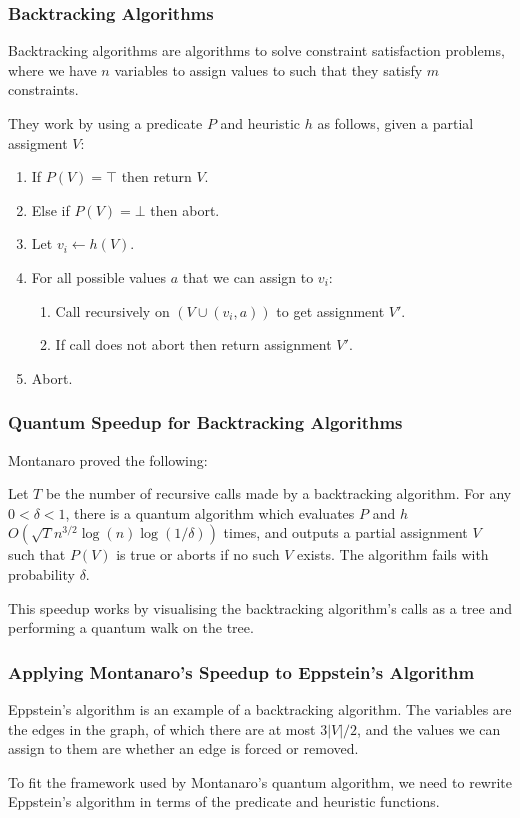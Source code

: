 \documentclass[]{beamer}
\begin{document}
\begin{frame}
\frametitle{Backtracking Algorithms}
Backtracking algorithms are algorithms to solve constraint satisfaction problems, where we have $n$ variables to assign values to such that they satisfy $m$ constraints.

They work by using a predicate $P$ and heuristic $h$ as follows, given a partial assigment $V$:

\begin{enumerate}
\item If $P(V) = \top$ then return $V$.
\item Else if $P(V) = \bot$ then abort.
\item Let $v_{i} \leftarrow h(V)$.
\item For all possible values $a$ that we can assign to $v_{i}$:
\begin{enumerate}
\item Call recursively on $(V \cup (v_{i}, a))$ to get assignment $V'$.
\item If call does not abort then return assignment $V'$.
\end{enumerate}
\item Abort.
\end{enumerate}
\end{frame}

\begin{frame}
\frametitle{Quantum Speedup for Backtracking Algorithms}

Montanaro proved the following:

\begin{theorem}[Montanaro]
Let $T$ be the number of recursive calls made by a backtracking algorithm. For any $0 < \delta < 1$, there is a quantum algorithm which evaluates $P$ and $h$ $O(\sqrt{T}n^{3/2}\log(n)\log(1/\delta))$ times, and outputs a partial assignment $V$ such that $P(V)$ is true or aborts if no such $V$ exists. The algorithm fails with probability $\delta$.
\end{theorem}

This speedup works by visualising the backtracking algorithm's calls as a tree and performing a quantum walk on the tree.
\end{frame}

\begin{frame}
\frametitle{Applying Montanaro's Speedup to Eppstein's Algorithm}

Eppstein's algorithm is an example of a backtracking algorithm. The variables are the edges in the graph, of which there are at most $3|V|/2$, and the values we can assign to them are whether an edge is forced or removed.

To fit the framework used by Montanaro's quantum algorithm, we need to rewrite Eppstein's algorithm in terms of the predicate and heuristic functions.
\end{frame}
\end{document}
